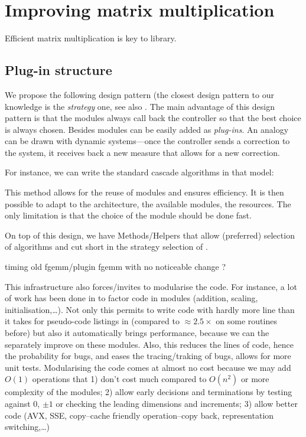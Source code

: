 \section{Improving \linbox matrix multiplication}\label{sec:matmul}
%
Efficient matrix multiplication is key to \linbox library.
%
\subsection{Plug-in structure}
%
We propose the following design pattern (the closest design pattern to our
knowledge is the \emph{strategy} one, see also \cite[Fig 2.]{Cung:2006:TC}.
The main advantage of this design pattern is that the modules always call back
the controller so that the best choice is always chosen.  Besides modules can
be easily added as \emph{plug-ins}.  An analogy can be drawn with dynamic
systems---once the controller sends a correction to the system, it receives
back a new measure that allows for a new correction.
%
\par
%

%
For instance, we can write the standard cascade algorithms in that model:
%
\par
%

%
This method allows for the reuse of modules and ensures efficiency.
It is then possible to adapt to the architecture, the available modules,
the resources. The only limitation is that the choice of the module
should be done fast.
%
\par
%
On top of this design, we have Methods/Helpers that allow (preferred) selection
of algorithms and cut short in the strategy selection of .
%
\par
%
\danger timing old fgemm/plugin fgemm with no noticeable change ?
%
\par
%
This infrastructure also forces/invites to modularise the code. For instance, a lot
of work has been done in \fflasffpack to factor code in modules (addition,
scaling, initialisation,\ldots). Not only this permits to write code with
hardly more line than it takes for pseudo-code listings in
\cite{Boyer:2009:sched} (compared to $\approx 2.5\times$ on some routines
before) but also it automatically brings performance, because we can the
separately improve on these modules. Also, this reduces the lines of code,
hence the probability for bugs, and eases the tracing/traking of bugs, allows
for more unit tests. Modularising the code comes at almost no cost because we
may add $O(1)$  operations that 1) don't cost much compared to $O(n^2)$ or more
complexity of the modules; 2) allow early decisions and terminations by testing
against $0$, $\pm 1$ or checking the leading dimensions and increments; 3)
allow better code (AVX, SSE, copy--cache friendly operation--copy back,
representation switching,\ldots)
%
